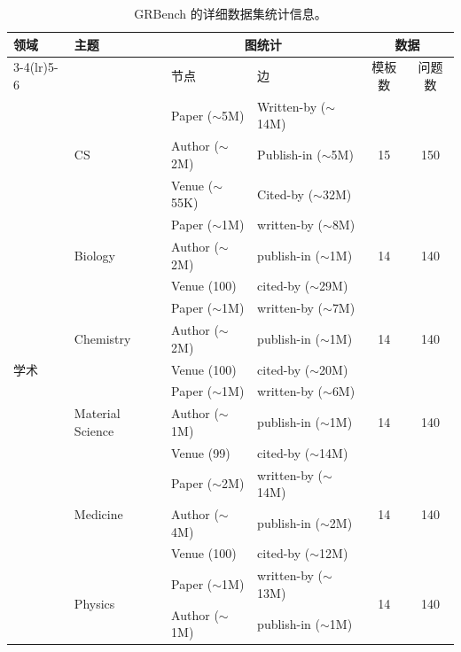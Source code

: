 \documentclass[11pt,UTF8,fontset=fandol]{ctexart}
\begin{document}
\begin{table}[H]\centering
\caption{GRBench 的详细数据集统计信息。}
\label{tab:5}
\small
\setlength{\tabcolsep}{4pt}
\begin{tabular}{llllcc}
\toprule
\multirow{2}{*}{领域} & \multirow{2}{*}{主题} & \multicolumn{2}{c}{图统计} & \multicolumn{2}{c}{数据} \\
\cmidrule(lr){3-4}\cmidrule(lr){5-6}
 &  & 节点 & 边 & 模板数 & 问题数 \\
\midrule
\multirow{18}{*}{学术}
 & \multirow{3}{*}{CS} & Paper ($\sim$5M) & Written-by ($\sim$14M) & \multirow{3}{*}{15} & \multirow{3}{*}{150} \\
 &  & Author ($\sim$2M) & Publish-in ($\sim$5M) &  &  \\
 &  & Venue ($\sim$55K) & Cited-by ($\sim$32M) &  &  \\
\cmidrule(lr){2-6}
 & \multirow{3}{*}{Biology} & Paper ($\sim$1M) & written-by ($\sim$8M) & \multirow{3}{*}{14} & \multirow{3}{*}{140} \\
 &  & Author ($\sim$2M) & publish-in ($\sim$1M) &  &  \\
 &  & Venue (100) & cited-by ($\sim$29M) &  &  \\
\cmidrule(lr){2-6}
 & \multirow{3}{*}{Chemistry} & Paper ($\sim$1M) & written-by ($\sim$7M) & \multirow{3}{*}{14} & \multirow{3}{*}{140} \\
 &  & Author ($\sim$2M) & publish-in ($\sim$1M) &  &  \\
 &  & Venue (100) & cited-by ($\sim$20M) &  &  \\
\cmidrule(lr){2-6}
 & \multirow{3}{*}{Material Science} & Paper ($\sim$1M) & written-by ($\sim$6M) & \multirow{3}{*}{14} & \multirow{3}{*}{140} \\
 &  & Author ($\sim$1M) & publish-in ($\sim$1M) &  &  \\
 &  & Venue (99) & cited-by ($\sim$14M) &  &  \\
\cmidrule(lr){2-6}
 & \multirow{3}{*}{Medicine} & Paper ($\sim$2M) & written-by ($\sim$14M) & \multirow{3}{*}{14} & \multirow{3}{*}{140} \\
 &  & Author ($\sim$4M) & publish-in ($\sim$2M) &  &  \\
 &  & Venue (100) & cited-by ($\sim$12M) &  &  \\
\cmidrule(lr){2-6}
 & \multirow{3}{*}{Physics} & Paper ($\sim$1M) & written-by ($\sim$13M) & \multirow{3}{*}{14} & \multirow{3}{*}{140} \\
 &  & Author ($\sim$1M) & publish-in ($\sim$1M) &  &  \\

\end{tabular}
\end{table}
\end{document}
